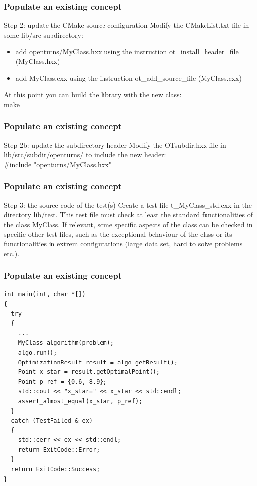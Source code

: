 \documentclass[8pt]{beamer}
\begin{document}
\begin{frame}
  \frametitle{Populate an existing concept}
  \begin{block}{Step 2: update the CMake source configuration}
    Modify the CMakeList.txt file in some lib/src subdirectory:
    \begin{itemize}
    \item add openturns/MyClass.hxx using the instruction {\ttfamily ot\_install\_header\_file (MyClass.hxx)}
    \item add MyClass.cxx using the instruction {\ttfamily ot\_add\_source\_file (MyClass.cxx)}
    \end{itemize}
    At this point you can build the library with the new class:\\
     {\ttfamily make}
  \end{block}
\end{frame}
\begin{frame}
  \frametitle{Populate an existing concept}
  \begin{block}{Step 2b: update the subdirectory header}
    Modify the OTsubdir.hxx file in lib/src/subdir/openturns/ to include the new header:\\
    {\ttfamily \#include "openturns/MyClass.hxx"}

  \end{block}
\end{frame}
\begin{frame}
  \frametitle{Populate an existing concept}
  \begin{block}{Step 3: the source code of the test(s)}
    Create a test file t\_MyClass\_std.cxx in the directory lib/test. This test file must check at least the standard functionalities of the class MyClass. If relevant, some specific aspects of the class can be checked in specific other test files, such as the exceptional behaviour of the class or its functionalities in extrem configurations (large data set, hard to solve problems etc.).
  \end{block}
\end{frame}

\begin{frame}[fragile]
  \frametitle{Populate an existing concept}
  \lstset{style=mystyle}
  
\begin{lstlisting}
int main(int, char *[])
{
  try
  {
    ...
    MyClass algorithm(problem);
    algo.run();
    OptimizationResult result = algo.getResult();
    Point x_star = result.getOptimalPoint();
    Point p_ref = {0.6, 8.9};
    std::cout << "x_star=" << x_star << std::endl;
    assert_almost_equal(x_star, p_ref);
  }
  catch (TestFailed & ex)
  {
    std::cerr << ex << std::endl;
    return ExitCode::Error;
  }
  return ExitCode::Success;
}
\end{lstlisting}
\end{frame}
\end{document}
